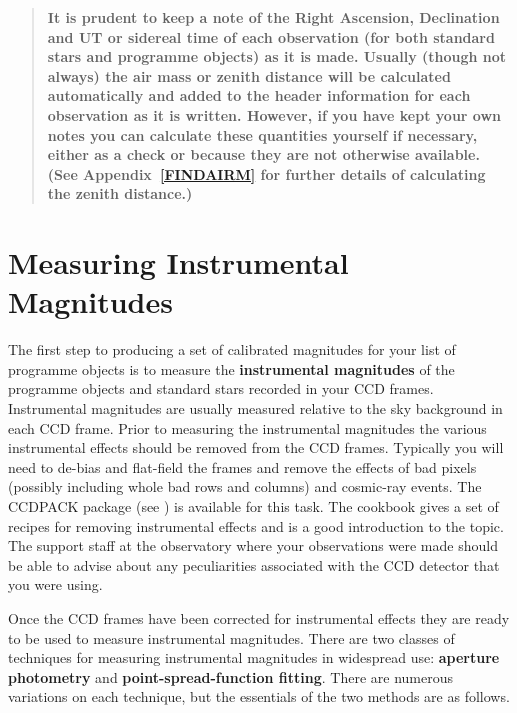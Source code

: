 \documentclass[twoside,11pt,nolof]{starlink}
\begin{document}
\begin{quote}
\textbf{It is prudent to keep a note of the Right Ascension, Declination and
UT or sidereal time of each observation (for both standard stars and
programme objects) as it is made.  Usually (though not always) the air
mass or zenith distance will be calculated automatically and added to the
header information for each observation as it is written.  However, if you
have kept your own notes you can calculate these quantities yourself
if necessary, either as a check or because they are not otherwise
available. (See Appendix~\ref{FINDAIRM} for further details of
calculating the zenith distance.)}
\end{quote}


\section{\label{MEASURE_INSTR}Measuring
Instrumental Magnitudes}

The first step to producing a set of calibrated magnitudes for your
list of programme objects is to measure the \textbf{instrumental
magnitudes} of the programme objects and standard stars recorded in
your CCD frames.  Instrumental magnitudes are usually measured relative
to the sky background in each CCD frame.  Prior to measuring the
instrumental magnitudes the various instrumental effects should be
removed from the CCD frames.  Typically you will need to de-bias and
flat-field the frames and remove the effects of bad pixels (possibly
including whole bad rows and columns) and cosmic-ray events.  The
CCDPACK package (see \cite{SUN139}) is available
for this task.  The cookbook \/\cite{SC5} gives a set of recipes for removing
instrumental effects and is a good introduction to the topic.  The support
staff at the observatory where your observations were made should be able
to advise about any peculiarities associated with the CCD detector that
you were using.

Once the CCD frames have been corrected for instrumental effects they
are ready to be used to measure instrumental magnitudes.  There are
two classes of techniques for measuring instrumental magnitudes in
widespread use: \textbf{aperture photometry} and \textbf{point-spread-function
fitting}.  There are numerous variations on each technique, but the
essentials of the two methods are as follows.
\end{document}
